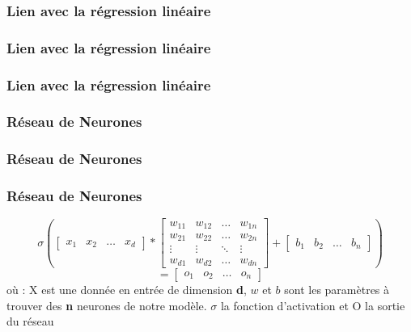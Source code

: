 \begin{frame}
  \frametitle{Lien avec la régression linéaire}
\end{frame}

\begin{frame}
  \frametitle{Lien avec la régression linéaire}
\end{frame}

\begin{frame}
  \frametitle{Lien avec la régression linéaire}
\end{frame}

\begin{frame}
  \frametitle{Réseau de Neurones}
\end{frame}

\begin{frame}
  \frametitle{Réseau de Neurones}
\end{frame}

\begin{frame}
  \frametitle{Réseau de Neurones}
  \[
  \sigma \left(
  \begin{bmatrix}
    x_{1} & x_{2} & \dots & x_{d}
  \end{bmatrix}
  *
  \begin{bmatrix}
    w_{11} & w_{12} & \dots  & w_{1n} \\
    w_{21} & w_{22} & \dots  & w_{2n} \\
    \vdots & \vdots & \ddots & \vdots \\
    w_{d1} & w_{d2} & \dots  & w_{dn}
  \end{bmatrix}
  +
  \begin{bmatrix}
    b_{1} & b_{2} & \dots & b_{n}
  \end{bmatrix}
  \right )
  \]
  \[
  =
  \begin{bmatrix}
    o_{1} & o_{2} & \dots & o_{n}
  \end{bmatrix}
  \]
  \newline
  où :
  \newline
  X est une donnée en entrée de dimension \textbf{d},
  \newline
  $w$ et $b$ sont les paramètres à trouver des \textbf{n} neurones de notre modèle.
  \newline
  $\sigma$ la fonction d'activation et
  \newline
  O la sortie du réseau
\end{frame}

